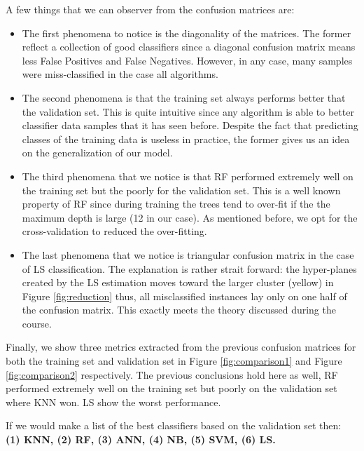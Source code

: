 \documentclass{article}
\begin{document}
A few things that we can observer from the confusion matrices are:
\begin{itemize}


\item The first phenomena to notice is the diagonality of the matrices. The former reflect a collection of good classifiers since a diagonal confusion matrix means less False Positives and False Negatives. However, in any case, many samples were miss-classified in the case all algorithms.

\item The second phenomena is that the training set always performs better that the validation set. This is quite intuitive since any algorithm is able to better classifier data samples that it has seen before. Despite the fact that predicting classes of the training data is useless in practice, the former gives us an idea on the generalization of our model.

\item The third phenomena that we notice is that RF performed extremely well on the training set but the poorly for the validation set. This is a well known property of RF since during training the trees tend to over-fit if the the maximum depth is large (12 in our case). As mentioned before, we opt for the cross-validation to reduced the over-fitting.

\item The last phenomena that we notice is triangular confusion matrix in the case of LS classification. The explanation is rather strait forward: the hyper-planes created by the LS estimation moves toward the larger cluster (yellow) in Figure \ref{fig:reduction} thus, all misclassified instances lay only on one half of the confusion matrix. This exactly meets the theory discussed during the course.


\end{itemize}

Finally, we show three metrics extracted from the previous confusion matrices for both the training set and validation set in Figure \ref{fig:comparison1} and Figure \ref{fig:comparison2} respectively. The previous conclusions hold here as well, RF performed extremely well on the training set but poorly on the validation set where KNN won. LS show the worst performance.

If we would make a list of the best classifiers based on the validation set then: \textbf{(1) KNN, (2) RF, (3) ANN, (4) NB, (5) SVM, (6) LS.}
 
\end{document}
